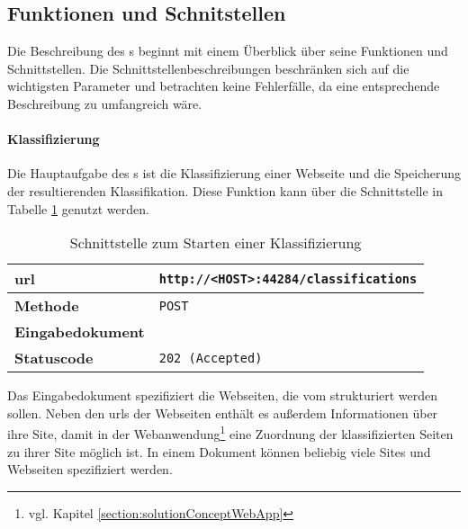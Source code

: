 \subsection{Funktionen und Schnitstellen}
    \label{section:solutionDetailsClassificationServiceFunctions}
    Die Beschreibung des {\classificationService}s beginnt mit einem
    Überblick über seine Funktionen und Schnittstellen.
    Die Schnittstellenbeschreibungen beschränken sich auf die wichtigsten
    Parameter und betrachten keine Fehlerfälle,
    da eine entsprechende Beschreibung zu umfangreich wäre.

    \paragraph{Klassifizierung}
    Die Hauptaufgabe des {\classificationService}s ist die Klassifizierung einer Webseite
    und die Speicherung der resultierenden Klassifikation.
    Diese Funktion kann über die Schnittstelle in Tabelle \ref{table:startClassificationInterface} genutzt werden.

    \begin{table}[htb]
        \centering
        \begin{tabular}{|l|l|}
        \hline
        \textbf{\gls{url}} & \texttt{http://<HOST>:44284/classifications}\\
        \hline
        \textbf{Methode} & \texttt{POST}\\
        \hline
        \textbf{Eingabedokument} & \\
        \hline
        \textbf{Statuscode} & \texttt{202 (Accepted)}\\
        \hline
        \end{tabular}
        \caption{Schnittstelle zum Starten einer Klassifizierung}
        \label{table:startClassificationInterface}
    \end{table}

    Das Eingabedokument spezifiziert die Webseiten,
    die vom {\classificationService} strukturiert werden sollen.
    Neben den \glspl{url} der Webseiten enthält es außerdem Informationen über ihre Site,
    damit in der Webanwendung\footnote{vgl. Kapitel \ref{section:solutionConceptWebApp}}
    eine Zuordnung der klassifizierten Seiten zu ihrer Site möglich ist.
    In einem Dokument können beliebig viele Sites und Webseiten spezifiziert werden.

